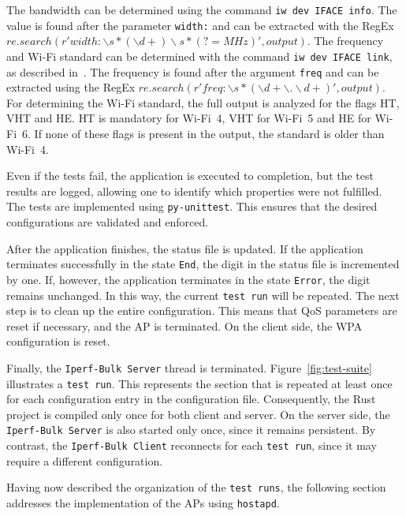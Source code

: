 The bandwidth can be determined using the command \texttt{iw dev IFACE info}.  
The value is found after the parameter \texttt{width:} and can be extracted with the \ac{RegEx} $re.search(r'width:\backslash s*(\backslash d+)\backslash s*(?=MHz)', output)$.  
The frequency and Wi-Fi standard can be determined with the command \texttt{iw dev IFACE link}, as described in~\cite{iw}.  
The frequency is found after the argument \texttt{freq} and can be extracted using the \ac{RegEx} $re.search(r'freq:\backslash s*(\backslash d+\backslash .\backslash d+)', output)$.  
For determining the Wi-Fi standard, the full output is analyzed for the flags \ac{HT}, \ac{VHT} and \ac{HE}.  
\ac{HT} is mandatory for Wi-Fi~4, \ac{VHT} for Wi-Fi~5 and \ac{HE} for Wi-Fi~6.  
If none of these flags is present in the output, the standard is older than Wi-Fi~4.  

Even if the tests fail, the application is executed to completion, but the test results are logged, allowing one to identify which properties were not fulfilled.  
The tests are implemented using \texttt{py-unittest}.  
This ensures that the desired configurations are validated and enforced.  

After the application finishes, the status file is updated.  
If the application terminates successfully in the state \texttt{End}, the digit in the status file is incremented by one.  
If, however, the application terminates in the state \texttt{Error}, the digit remains unchanged.  
In this way, the current \texttt{test run} will be repeated.  
The next step is to clean up the entire configuration.  
This means that \ac{QoS} parameters are reset if necessary, and the \ac{AP} is terminated.  
On the client side, the \ac{WPA} configuration is reset.  

Finally, the \texttt{Iperf-Bulk Server} thread is terminated.  
Figure~\ref{fig:test-suite} illustrates a \texttt{test run}.  
This represents the section that is repeated at least once for each configuration entry in the configuration file.  
Consequently, the Rust project is compiled only once for both client and server.  
On the server side, the \texttt{Iperf-Bulk Server} is also started only once, since it remains persistent.  
By contrast, the \texttt{Iperf-Bulk Client} reconnects for each \texttt{test run}, since it may require a different configuration.  

Having now described the organization of the \texttt{test runs}, the following section addresses the implementation of the \acp{AP} using \texttt{hostapd}.  


